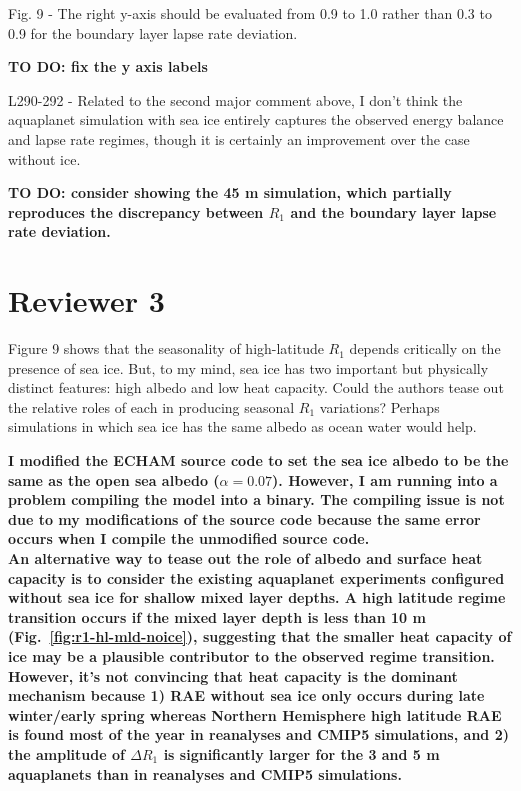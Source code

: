 \documentclass{article}
\begin{document}
Fig. 9 - The right y-axis should be evaluated from 0.9 to 1.0 rather than 0.3 to 0.9 for the boundary layer lapse rate deviation.

{\color{red}\textbf{TO DO: fix the y axis labels}}

L290-292 - Related to the second major comment above, I don't think the aquaplanet simulation with sea ice entirely captures the observed energy balance and lapse rate regimes, though it is certainly an improvement over the case without ice.

{\color{red}\textbf{TO DO: consider showing the 45 m simulation, which partially reproduces the discrepancy between $R_1$ and the boundary layer lapse rate deviation.}}

\section*{Reviewer 3}

Figure 9 shows that the seasonality of high-latitude $R_1$ depends critically on the presence of sea ice. But, to my mind, sea ice has two important but physically distinct features: high albedo and low heat capacity. Could the authors tease out the relative roles of each in producing seasonal $R_1$ variations? Perhaps simulations in which sea ice has the same albedo as ocean water would help.

{\color{red}\textbf{I modified the ECHAM source code to set the sea ice albedo to be the same as the open sea albedo ($\alpha=0.07$). However, I am running into a problem compiling the model into a binary. The compiling issue is not due to my modifications of the source code because the same error occurs when I compile the unmodified source code.\\ \newline An alternative way to tease out the role of albedo and surface heat capacity is to consider the existing aquaplanet experiments configured without sea ice for shallow mixed layer depths. A high latitude regime transition occurs if the mixed layer depth is less than 10 m (Fig.~\ref{fig:r1-hl-mld-noice}), suggesting that the smaller heat capacity of ice may be a plausible contributor to the observed regime transition. However, it's not convincing that heat capacity is the dominant mechanism because 1) RAE without sea ice only occurs during late winter/early spring whereas Northern Hemisphere high latitude RAE is found most of the year in reanalyses and CMIP5 simulations, and 2) the amplitude of $\Delta R_1$ is significantly larger for the 3 and 5 m aquaplanets than in reanalyses and CMIP5 simulations.}}
\end{document}
